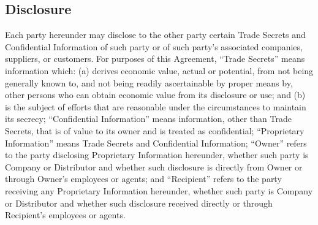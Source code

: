 \documentclass[letterpaper,10pt,openany,oneside,english]{sphinxmanual}
\begin{document}
\subsection{Disclosure}
\label{\detokenize{nondisclosure:disclosure}}
Each party hereunder may disclose to the other party certain Trade Secrets and Confidential Information of such party or of such party’s associated companies, suppliers, or customers. For purposes of this Agreement, “Trade Secrets” means information which: (a) derives economic value, actual or potential, from not being generally known to, and not being readily ascertainable by proper means by, other persons who can obtain economic value from its disclosure or use; and (b) is the subject of efforts that are reasonable under the circumstances to maintain its secrecy; “Confidential Information” means information, other than Trade Secrets, that is of value to its owner and is treated as confidential; “Proprietary Information” means Trade Secrets and Confidential Information; “Owner” refers to the party disclosing Proprietary Information hereunder, whether such party is Company or Distributor and whether such disclosure is directly from Owner or through Owner’s employees or agents; and “Recipient” refers to the party receiving any Proprietary Information hereunder, whether such party is Company or Distributor and whether such disclosure received directly or through Recipient’s employees or agents.
\end{document}
